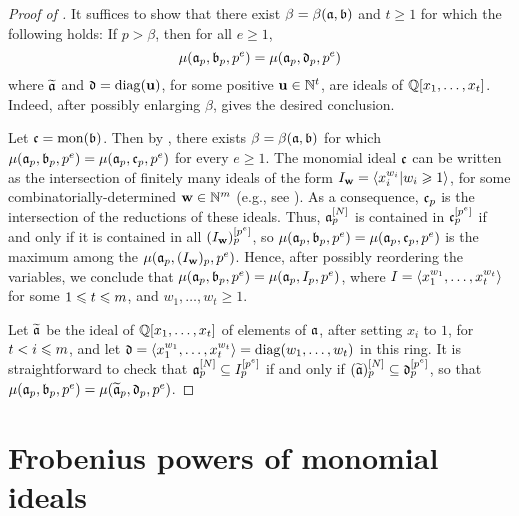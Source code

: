 \documentclass[11pt]{amsart}
\begin{document}
\begin{proof}[Proof of ]
It suffices to show that there exist $\beta = \beta(\mathfrak{a},\mathfrak{b})$ and $t \geq 1$  for which the following holds: 
If $p > \beta$, then for all $e\geq1$, 
\[ \mu(\mathfrak{a}_p, \mathfrak{b}_p, p^e)= \mu(\mathfrak{a}_p, \mathfrak{d}_p, p^e) \]  where $\widetilde{\mathfrak{a}}$ and $\mathfrak{d} = \operatorname{diag}(\mathbf{u})$, for some positive $\mathbf{u} \in \mathbb{N}^t$,  are ideals of $\mathbb{Q}[x_1, \ldots, x_t]$.
Indeed, after possibly enlarging $\beta$,  
gives the desired conclusion.

Let $\mathfrak{c} = \operatorname{mon}(\mathfrak{b})$. Then by , there exists $\beta= \beta(\mathfrak{a}, \mathfrak{b})$ for which $\mu(\mathfrak{a}_p, \mathfrak{b}_p, p^e) = \mu(\mathfrak{a}_p, \mathfrak{c}_p, p^e)$ for every $e \geq 1$. 
The monomial ideal $\mathfrak{c}$ can be written as the intersection of finitely many ideals of the form $I_{\mathbf{w}} = \langle x_i^{w_i} | w_i \geqslant 1 \rangle$, for some combinatorially-determined $\mathbf{w} \in \mathbb{N}^m$ (e.g., see \cite[Lemma 5.18]{miller+sturmfels.combinatorial_CA}).  As a consequence, $\mathfrak{c}_p$ is the intersection of the reductions of these ideals. 
Thus, $\mathfrak{a}_p^{[N]}$ is contained in $\mathfrak{c}_p^{[p^e]}$ if and only if it is contained in all  $(I_{\mathbf{w}})_p^{[p^e]}$, so $\mu(\mathfrak{a}_p, \mathfrak{b}_p, p^e) = \mu(\mathfrak{a}_p, \mathfrak{c}_p, p^e)$ is the maximum among the  $\mu(\mathfrak{a}_p, (I_{\mathbf{w}})_p, p^e)$.
Hence, after possibly reordering the variables, we conclude that $\mu(\mathfrak{a}_p, \mathfrak{b}_p, p^e) = \mu(\mathfrak{a}_p, I_p, p^e )$, where $I = \langle x_1^{w_1}, \ldots, x_t^{w_t} \rangle$ for some $1 \leqslant t \leqslant m$, and $w_1, \ldots, w_t \geq 1$.

Let $\widetilde{\mathfrak{a}}$ be the ideal of $\mathbb{Q}[x_1, \ldots, x_t]$ of elements of $\mathfrak{a}$, after setting $x_i$ to $1$, for $t < i \leqslant m$, and let $\mathfrak{d} = \langle x_1^{w_1}, \ldots, x_t^{w_t} \rangle= \operatorname{diag}(w_1, \ldots, w_t)$ in this ring.
It is straightforward to check that $\mathfrak{a}_p^{[N]} \subseteq I_p^{[p^e]}$ if and only if  $(\widetilde{\mathfrak{a}})_p^{[N]} \subseteq \mathfrak{d}_p^{[p^e]}$, so that $\mu(\mathfrak{a}_p, \mathfrak{b}_p, p^e) = \mu(\widetilde{\mathfrak{a}}_p, \mathfrak{d}_p, p^e)$.
\end{proof}




\newpage
\section{Frobenius powers of monomial ideals}
\end{document}
